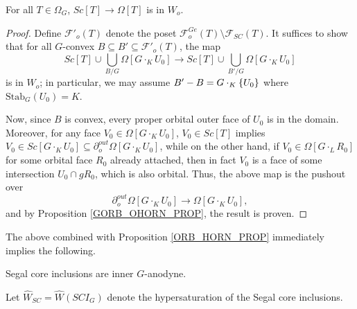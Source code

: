 \documentclass[a4paper,10pt,draft]{article}%
\begin{document}
\begin{proposition}
      \label{SC_IN_OHORN_PROP}
      For all $T \in \Omega_G$, $Sc[T] \to \Omega[T]$ is in $W_o$. 
\end{proposition}
\begin{proof}
      Define $\mathscr{F}'_{o}(T)$ denote the poset %
      $\mathscr{F}_{o}^{G e}(T) \setminus \mathscr{F}_{SC}(T)$.
      It suffices to show that for all $G$-convex $B \subseteq B' \subseteq \mathscr{F}'_o(T)$, the map
      \begin{equation}
            Sc[T] \cup \mathop{\bigcup}\limits_{B/G}\Omega[G \cdot_K U_0]
            \to
            Sc[T] \cup \mathop{\bigcup}\limits_{B'/G}\Omega[G \cdot_K U_0]
      \end{equation}
      is in $W_o$; in particular, we may assume $B' - B = G \cdot_K \left\{U_0\right\}$ where $\mathrm{Stab}_G(U_0) = K$.

      Now, since $B$ is convex, every proper orbital outer face of $U_0$ is in the domain.
      Moreover, for any face $V_0 \in \Omega[G \cdot_K U_0]$,
      $V_0 \in Sc[T]$ implies
      $V_0 \in Sc[G \cdot_K U_0] \subseteq \partial^{out}_o\Omega[G \cdot_K U_0]$,
      while on the other hand,
      if $V_0 \in \Omega[G \cdot_L R_0]$ for some orbital face $R_0$ already attached,
      then in fact $V_0$ is a face of some intersection $U_0 \cap g R_0$,
      which is also orbital.
      Thus, the above map is the pushout over
      \begin{equation}
            \partial^{out}_o\Omega[G \cdot_K U_0] \to \Omega[G \cdot_K U_0],
      \end{equation}
      and by Proposition \ref{GORB_OHORN_PROP}, the result is proven.
\end{proof}

The above combined with Proposition \ref{ORB_HORN_PROP} immediately implies the following.
\begin{corollary}
      Segal core inclusions are inner $G$-anodyne.
\end{corollary}


\begin{definition}
      Let $\hat{W}_{SC} = \hat{W}(SCI_G)$ denote the hypersaturation of the Segal core inclusions.
\end{definition}
\end{document}

